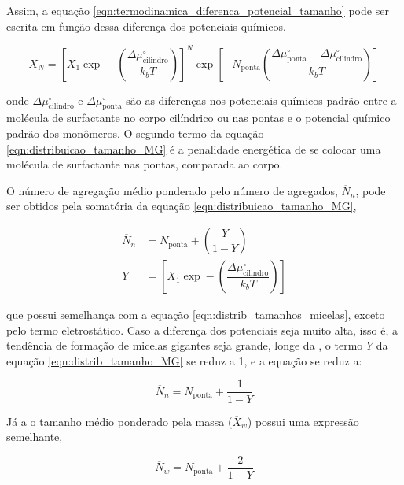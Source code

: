 		Assim, a equação \ref{eqn:termodinamica_diferenca_potencial_tamanho} pode ser escrita em função dessa diferença dos potenciais químicos.
		
		\begin{equation}
			X_N = \left[ X_1 \exp - \left( \dfrac{\Delta \mu_\mathrm{cilindro}^\circ}{k_b T} \right)  \right]^N \exp \left[ -N_\mathrm{ponta} \left( \dfrac{\Delta \mu_\mathrm{ponta}^\circ - \Delta \mu_\mathrm{cilindro}^\circ}{k_bT} \right)  \right]
			\label{eqn:distribuicao_tamanho_MG}
		\end{equation}
		
		\noindent onde \(\Delta \mu_\mathrm{cilindro}^\circ\) e \(\Delta \mu_\mathrm{ponta}^\circ\) são as diferenças nos potenciais químicos padrão entre a molécula de surfactante no corpo cilíndrico ou nas pontas e o potencial químico padrão dos monômeros. O segundo termo da equação \ref{eqn:distribuicao_tamanho_MG} é a penalidade energética de se colocar uma molécula de surfactante nas pontas, comparada ao corpo.
		
		O número de agregação médio ponderado pelo número de agregados, \(\overline{N}_n\), pode ser obtidos pela somatória da equação \ref{eqn:distribuicao_tamanho_MG},
		
		\begin{subequations}
			\begin{align}
			\overline{N}_n &= N_\mathrm{ponta} + \left( \dfrac{Y}{1 - Y} \right )  \\
			Y  &= \left[ X_1 \exp - \left( \dfrac{\Delta \mu_\mathrm{cilindro}^\circ}{k_b T} \right) \right]
			\end{align}
			\label{eqn:distrib_tamanho_MG}
		\end{subequations}
				
		\noindent que possui semelhança com a equação \ref{eqn:distrib_tamanhos_micelas}, exceto pelo termo eletrostático. Caso a diferença dos potenciais seja muito alta, isso é, a tendência de formação de micelas gigantes seja grande, longe da \cmc, o termo \(Y\) da equação \ref{eqn:distrib_tamanho_MG} se reduz a 1, e a equação se reduz a:
		
		\begin{equation}
			\overline{N}_n = N_\mathrm{ponta} + \dfrac{1}{1 - Y}
			\label{eqn:distrib_tamanho_MG_reduzida}
		\end{equation}
		
		Já a o tamanho médio ponderado pela massa (\(\overline{X}_w\)) possui uma expressão semelhante,
		
		\begin{equation}
			\overline{N}_w = N_\mathrm{ponta} + \dfrac{2}{1 - Y}
			\label{eqn:distrib_tamanho_MG_reduzida_massa}
		\end{equation}
		

